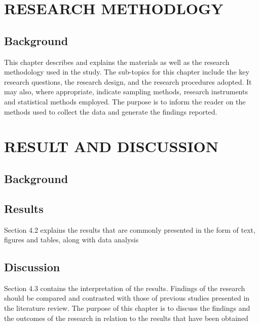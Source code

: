 \documentclass[12pt, a4paper]{report}
\begin{document}
		
		
		
		
		
		
		\setcounter{chapter}{6}
        \setcounter{section}{0}
		\chapter{\textbf{RESEARCH METHODLOGY}}{
			\begin{flushleft}
				\section{Background}{
					This chapter describes and explains the materials as well as the research methodology used in the study. The sub-topics for this chapter include the key research questions, the research design, and the research procedures adopted. It may also, where appropriate, indicate sampling methods, research instruments and statistical methods employed. The purpose is to inform the reader on the methods used to collect the data and generate the findings reported.
				}
			\end{flushleft}
		}
		
		
		
		
		
		
		
		
		
		\setcounter{chapter}{7}
		\setcounter{section}{0}
		\chapter{ \textbf{RESULT AND DISCUSSION}}{
			\begin{flushleft}
				\section{Background}{
				}
		
				\section{Results}{
					Section 4.2 explains the results that are commonly presented in the form of text, figures and tables, along with data analysis
				}
				\section{Discussion}{
					Section 4.3 contains the interpretation of the results. Findings of the research should be compared and contrasted with those of previous studies presented in the literature review. The purpose of this chapter is to discuss the findings and the outcomes of the research in relation to the results that have been obtained
				}
				
				\end{flushleft}
			}
			
\end{document}
